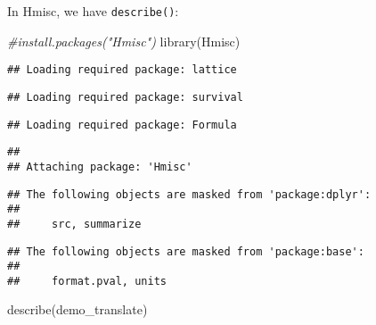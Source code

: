 \documentclass[
]{book}
\newenvironment{Shaded}{\begin{snugshade}}{\end{snugshade}}
\newcommand{\CommentTok}[1]{\textcolor[rgb]{0.56,0.35,0.01}{\textit{#1}}}
\newcommand{\FunctionTok}[1]{\textcolor[rgb]{0.00,0.00,0.00}{#1}}
\newcommand{\NormalTok}[1]{#1}
\begin{document}
In Hmisc, we have \texttt{describe()}:

\begin{Shaded}
\begin{Highlighting}[]
\CommentTok{\#install.packages("Hmisc")}
\FunctionTok{library}\NormalTok{(Hmisc)}
\end{Highlighting}
\end{Shaded}

\begin{verbatim}
## Loading required package: lattice
\end{verbatim}

\begin{verbatim}
## Loading required package: survival
\end{verbatim}

\begin{verbatim}
## Loading required package: Formula
\end{verbatim}

\begin{verbatim}
## 
## Attaching package: 'Hmisc'
\end{verbatim}

\begin{verbatim}
## The following objects are masked from 'package:dplyr':
## 
##     src, summarize
\end{verbatim}

\begin{verbatim}
## The following objects are masked from 'package:base':
## 
##     format.pval, units
\end{verbatim}

\begin{Shaded}
\begin{Highlighting}[]
\FunctionTok{describe}\NormalTok{(demo\_translate)}
\end{Highlighting}
\end{Shaded}
\end{document}
